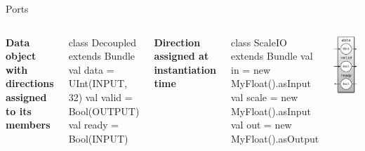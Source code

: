 \documentclass[xcolor=pdflatex,dvipsnames,table]{beamer}
\begin{document}
\begin{frame}[fragile]{Ports}

\begin{columns}

\textbf{Data object with directions assigned to its members}

\begin{scala}
class Decoupled extends Bundle {
  val data  = UInt(INPUT, 32)
  val valid = Bool(OUTPUT)
  val ready = Bool(INPUT)
}
\end{scala}

\textbf{Direction assigned at instantiation time}

\begin{scala}
class ScaleIO extends Bundle {
  val in    = new MyFloat().asInput
  val scale = new MyFloat().asInput
  val out   = new MyFloat().asOutput
}
\end{scala}


\begin{center}
\includegraphics[height=0.9\textheight]{figs/fifoio.pdf} 
\end{center}

\end{columns}

\end{frame}
\end{document}

